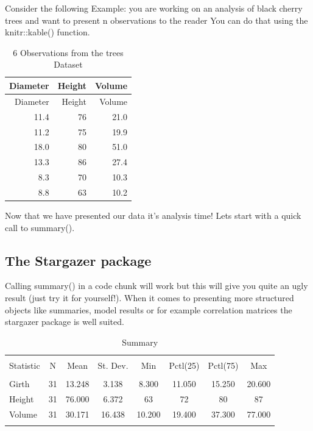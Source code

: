 \documentclass[11pt,]{article}
\begin{document}
Consider the following Example: you are working on an analysis of black
cherry trees and want to present n observations to the reader You can do
that using the knitr::kable() function.

\begin{longtable}[]{@{}rrr@{}}
\caption{6 Observations from the trees Dataset}\tabularnewline
\toprule
Diameter & Height & Volume\tabularnewline
\midrule
\endfirsthead
\toprule
Diameter & Height & Volume\tabularnewline
\midrule
\endhead
11.4 & 76 & 21.0\tabularnewline
11.2 & 75 & 19.9\tabularnewline
18.0 & 80 & 51.0\tabularnewline
13.3 & 86 & 27.4\tabularnewline
8.3 & 70 & 10.3\tabularnewline
8.8 & 63 & 10.2\tabularnewline
\bottomrule
\end{longtable}

Now that we have presented our data it's analysis time! Lets start with
a quick call to summary().

\subsection{The Stargazer package}\label{the-stargazer-package}

Calling summary() in a code chunk will work but this will give you quite
an ugly result (just try it for yourself!). When it comes to presenting
more structured objects like summaries, model results or for example
correlation matrices the stargazer package is well suited.

\begin{table}[!htbp] \centering 
  \caption{Summary} 
  \label{} 
\begin{tabular}{@{\extracolsep{5pt}}lccccccc} 
\\[-1.8ex]\hline 
\hline \\[-1.8ex] 
Statistic & \multicolumn{1}{c}{N} & \multicolumn{1}{c}{Mean} & \multicolumn{1}{c}{St. Dev.} & \multicolumn{1}{c}{Min} & \multicolumn{1}{c}{Pctl(25)} & \multicolumn{1}{c}{Pctl(75)} & \multicolumn{1}{c}{Max} \\ 
\hline \\[-1.8ex] 
Girth & 31 & 13.248 & 3.138 & 8.300 & 11.050 & 15.250 & 20.600 \\ 
Height & 31 & 76.000 & 6.372 & 63 & 72 & 80 & 87 \\ 
Volume & 31 & 30.171 & 16.438 & 10.200 & 19.400 & 37.300 & 77.000 \\ 
\hline \\[-1.8ex] 
\end{tabular} 
\end{table}
\end{document}
